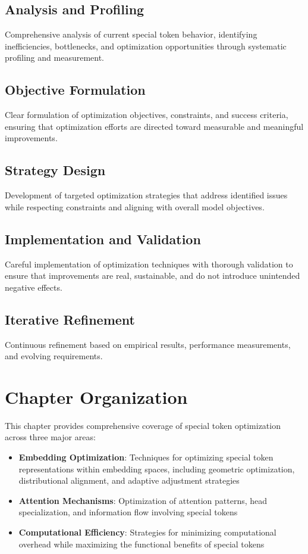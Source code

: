 \subsection{Analysis and Profiling}

Comprehensive analysis of current special token behavior, identifying inefficiencies, bottlenecks, and optimization opportunities through systematic profiling and measurement.

\subsection{Objective Formulation}

Clear formulation of optimization objectives, constraints, and success criteria, ensuring that optimization efforts are directed toward measurable and meaningful improvements.

\subsection{Strategy Design}

Development of targeted optimization strategies that address identified issues while respecting constraints and aligning with overall model objectives.

\subsection{Implementation and Validation}

Careful implementation of optimization techniques with thorough validation to ensure that improvements are real, sustainable, and do not introduce unintended negative effects.

\subsection{Iterative Refinement}

Continuous refinement based on empirical results, performance measurements, and evolving requirements.

\section{Chapter Organization}

This chapter provides comprehensive coverage of special token optimization across three major areas:

\begin{itemize}
\item \textbf{Embedding Optimization}: Techniques for optimizing special token representations within embedding spaces, including geometric optimization, distributional alignment, and adaptive adjustment strategies
\item \textbf{Attention Mechanisms}: Optimization of attention patterns, head specialization, and information flow involving special tokens
\item \textbf{Computational Efficiency}: Strategies for minimizing computational overhead while maximizing the functional benefits of special tokens
\end{itemize}

